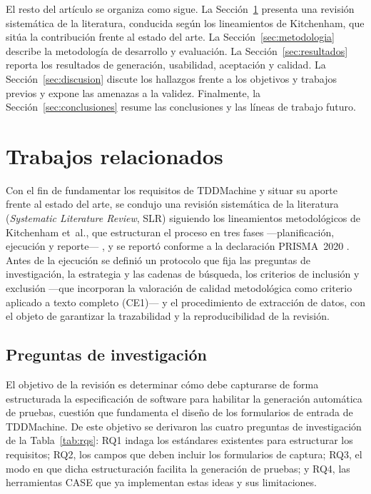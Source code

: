 \documentclass[10pt,journal,twoside,letterpaper]{IEEEtran}
\begin{document}
	El resto del artículo se organiza como sigue. La Sección~\ref{sec:trabajos} presenta una revisión sistemática de la literatura, conducida según los lineamientos de Kitchenham, que sitúa la contribución frente al estado del arte. La Sección~\ref{sec:metodologia} describe la metodología de desarrollo y evaluación. La Sección~\ref{sec:resultados} reporta los resultados de generación, usabilidad, aceptación y calidad. La Sección~\ref{sec:discusion} discute los hallazgos frente a los objetivos y trabajos previos y expone las amenazas a la validez. Finalmente, la Sección~\ref{sec:conclusiones} resume las conclusiones y las líneas de trabajo futuro.

	\section{Trabajos relacionados}
	\label{sec:trabajos}

	Con el fin de fundamentar los requisitos de TDDMachine y situar su aporte frente al estado del arte, se condujo una revisión sistemática de la literatura (\emph{Systematic Literature Review}, SLR) siguiendo los lineamientos metodológicos de Kitchenham et~al., que estructuran el proceso en tres fases ---planificación, ejecución y reporte--- \cite{kitchenham2009slr}, y se reportó conforme a la declaración PRISMA~2020 \cite{prisma2020}. Antes de la ejecución se definió un protocolo que fija las preguntas de investigación, la estrategia y las cadenas de búsqueda, los criterios de inclusión y exclusión ---que incorporan la valoración de calidad metodológica como criterio aplicado a texto completo (CE1)--- y el procedimiento de extracción de datos, con el objeto de garantizar la trazabilidad y la reproducibilidad de la revisión.

	\subsection{Preguntas de investigación}
	\label{subsec:rqs}

	El objetivo de la revisión es determinar cómo debe capturarse de forma estructurada la especificación de software para habilitar la generación automática de pruebas, cuestión que fundamenta el diseño de los formularios de entrada de TDDMachine. De este objetivo se derivaron las cuatro preguntas de investigación de la Tabla~\ref{tab:rqs}: RQ1 indaga los estándares existentes para estructurar los requisitos; RQ2, los campos que deben incluir los formularios de captura; RQ3, el modo en que dicha estructuración facilita la generación de pruebas; y RQ4, las herramientas CASE que ya implementan estas ideas y sus limitaciones.
\end{document}
